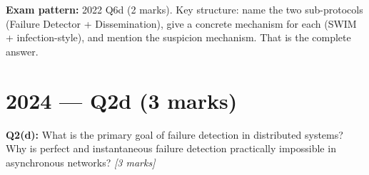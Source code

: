 \documentclass[12pt,a4paper]{article}
\begin{document}
\begin{notesbox}
\textbf{Exam pattern:} 2022 Q6d (2 marks). Key structure: name the two sub-protocols
(Failure Detector + Dissemination), give a concrete mechanism for each (SWIM + infection-style),
and mention the suspicion mechanism. That is the complete answer.
\end{notesbox}

\newpage
\section{2024 — Q2d (3 marks)}

\begin{qbox}
\textbf{Q2(d):} What is the primary goal of failure detection in distributed systems?
Why is perfect and instantaneous failure detection practically impossible in asynchronous
networks? \hfill \textit{[3 marks]}
\end{qbox}
\end{document}

